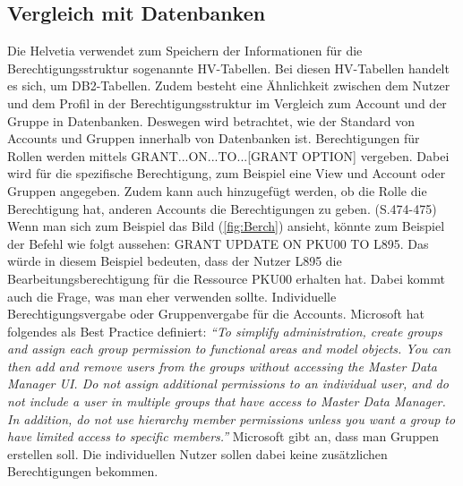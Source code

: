 \subsection{Vergleich mit Datenbanken}
\label{sec:chapter04:DB}
Die Helvetia verwendet zum Speichern der Informationen für die Berechtigungsstruktur sogenannte HV-Tabellen.
Bei diesen HV-Tabellen handelt es sich, um DB2-Tabellen.
Zudem besteht eine Ähnlichkeit zwischen dem Nutzer und dem Profil in der Berechtigungsstruktur im Vergleich zum Account und der Gruppe in Datenbanken.
Deswegen wird betrachtet, wie der Standard von Accounts und Gruppen innerhalb von Datenbanken ist.
\newline
Berechtigungen für Rollen werden mittels GRANT...ON...TO...[GRANT OPTION] vergeben.
Dabei wird für die spezifische Berechtigung, zum Beispiel eine View und Account oder Gruppen angegeben.
Zudem kann auch hinzugefügt werden, ob die Rolle die Berechtigung hat, anderen Accounts die Berechtigungen zu geben.\cite{Ram09} (S.474-475)
\newline
Wenn man sich zum Beispiel das Bild (\ref{fig:Berch}) ansieht, könnte zum Beispiel der Befehl wie folgt aussehen:
\newline
\newline
GRANT UPDATE ON PKU00 TO L895.
\newline
\newline
Das würde in diesem Beispiel bedeuten, dass der Nutzer L895 die Bearbeitungsberechtigung für die Ressource PKU00 erhalten hat.
Dabei kommt auch die Frage, was man eher verwenden sollte.
Individuelle Berechtigungsvergabe oder Gruppenvergabe für die Accounts.
Microsoft hat folgendes als Best Practice definiert:
\newline
\newline
\textit{"`To simplify administration, create groups and assign each group permission to functional areas and model objects.
You can then add and remove users from the groups without accessing the Master Data Manager UI.
\newline
\newline
Do not assign additional permissions to an individual user, and do not include a user in multiple groups that have access to Master Data Manager. In addition, do not use hierarchy member permissions unless you want a group to have limited access to specific members."'} \cite{Micro}
\newline
\newline
Microsoft gibt an, dass man Gruppen erstellen soll.
Die individuellen Nutzer sollen dabei keine zusätzlichen Berechtigungen bekommen.
